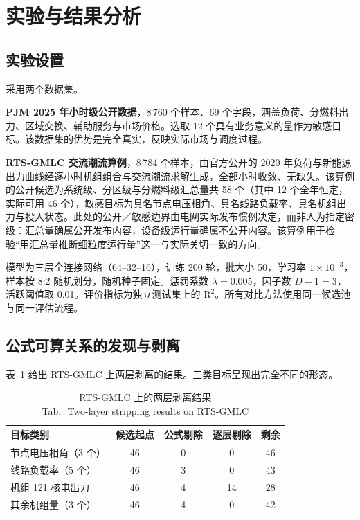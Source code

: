 \documentclass[UTF8,zihao=5,twoside]{ctexart}
\newcommand{\tabbicaption}[2]{\caption{#1\\[-0.2em]\small Tab.\,\thetable\ #2}}
\begin{document}
\section{实验与结果分析}

\subsection{实验设置}

采用两个数据集。

\textbf{PJM 2025 年小时级公开数据}，8\,760 个样本、69 个字段，涵盖负荷、分燃料出力、区域交换、辅助服务与市场价格。选取 12 个具有业务意义的量作为敏感目标。该数据集的优势是完全真实，反映实际市场与调度过程。

\textbf{RTS-GMLC 交流潮流算例}，8\,784 个样本，由官方公开的 2020 年负荷与新能源出力曲线经逐小时机组组合与交流潮流求解生成，全部小时收敛、无缺失。该算例的公开候选为系统级、分区级与分燃料级汇总量共 58 个（其中 12 个全年恒定，实际可用 46 个），敏感目标为具名节点电压相角、具名线路负载率、具名机组出力与投入状态。此处的公开／敏感边界由电网实际发布惯例决定，而非人为指定密级：汇总量确属公开发布内容，设备级运行量确属不公开内容。该算例用于检验“用汇总量推断细粒度运行量”这一与实际关切一致的方向。

模型为三层全连接网络（64--32--16），训练 200 轮，批大小 50，学习率 $1\times10^{-3}$，样本按 8:2 随机划分，随机种子固定。惩罚系数 $\lambda=0.005$，因子数 $D-1=3$，活跃阈值取 0.01。评价指标为独立测试集上的 $\mathrm{R}^2$。所有对比方法使用同一候选池与同一评估流程。

\subsection{公式可算关系的发现与剥离}

表~\ref{tab:strip} 给出 RTS-GMLC 上两层剥离的结果。三类目标呈现出完全不同的形态。

\begin{table}[!tbp]
\centering
\tabbicaption{RTS-GMLC 上的两层剥离结果}{Two-layer stripping results on RTS-GMLC}
\label{tab:strip}
\begin{tabular}{lcccc}
\toprule
目标类别 & 候选起点 & 公式剔除 & 逐层剔除 & 剩余 \\
\midrule
节点电压相角（3 个） & 46 & 0 & 0 & 46 \\
线路负载率（5 个） & 46 & 3 & 0 & 43 \\
机组 121 核电出力 & 46 & 4 & 14 & 28 \\
其余机组量（3 个） & 46 & 4 & 0 & 42 \\
\bottomrule
\end{tabular}
\end{table}
\end{document}

